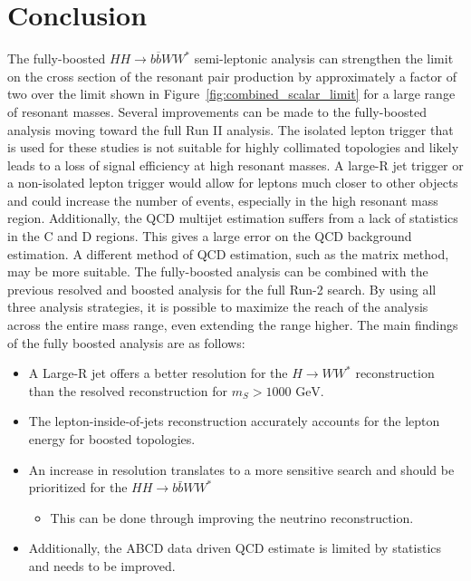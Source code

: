 \section{Conclusion}
The fully-boosted ${HH\rightarrow b\overline{b}WW^{*}}$ semi-leptonic analysis can strengthen the limit on the cross section of the resonant pair production by approximately a factor of two over the limit shown in Figure~\ref{fig:combined_scalar_limit} for a large range of resonant masses. \newline
\indent Several improvements can be made to the fully-boosted analysis moving toward the full Run II analysis. The isolated lepton trigger that is used for these studies is not suitable for highly collimated topologies and likely leads to a loss of signal efficiency at high resonant masses. A large-R jet trigger or a non-isolated lepton trigger would allow for leptons much closer to other objects and could increase the number of events, especially in the high resonant mass region. Additionally, the QCD multijet estimation suffers from a lack of statistics in the C and D regions. This gives a large error on the QCD background estimation. A different method of QCD estimation, such as the matrix method, may be more suitable.\newline
\indent The fully-boosted analysis can be combined with the previous resolved and boosted analysis for the full Run-2 search. By using all three analysis strategies, it is possible to maximize the reach of the analysis across the entire mass range, even extending the range higher. 
\indent The main findings of the fully boosted analysis are as follows:
\begin{itemize}
\item A Large-R jet offers a better resolution for the $H\rightarrow WW^*$ reconstruction than the resolved reconstruction for $m_S > 1000\text{ GeV}$.
\item The lepton-inside-of-jets reconstruction accurately accounts for the lepton energy for boosted topologies.
\item An increase in resolution translates to a more sensitive search and should be prioritized for the $HH\rightarrow{}b\bar{b}WW^*$
\begin{itemize}
\item This can be done through improving the neutrino reconstruction.
\end{itemize}
\item Additionally, the ABCD data driven QCD estimate is limited by statistics and needs to be improved.

\end{itemize}

